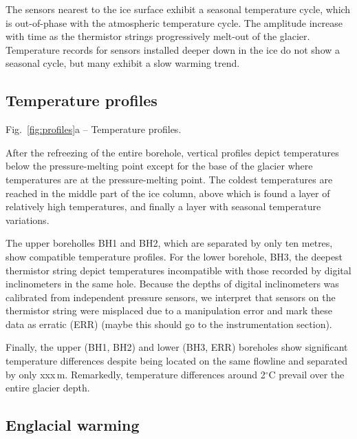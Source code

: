 \documentclass[utf8]{article}
\begin{document}
    The sensors nearest to the ice surface exhibit a seasonal temperature
    cycle, which is out-of-phase with the atmospheric temperature cycle. The
    amplitude increase with time as the thermistor strings progressively
    melt-out of the glacier. Temperature records for sensors installed deeper
    down in the ice do not show a seasonal cycle, but many exhibit a slow
    warming trend.


\subsection{Temperature profiles}

    Fig.~\ref{fig:profiles}a -- Temperature profiles.

    After the refreezing of the entire borehole, vertical profiles depict
    temperatures below the pressure-melting point except for the base of the
    glacier where temperatures are at the pressure-melting point. The coldest
    temperatures are reached in the middle part of the ice column, above which
    is found a layer of relatively high temperatures, and finally a layer with
    seasonal temperature variations.

    The upper boreholles BH1 and BH2, which are separated by only ten metres,
    show compatible temperature profiles. For the lower borehole, BH3, the
    deepest thermistor string depict temperatures incompatible with those
    recorded by digital inclinometers in the same hole. Because the depths of
    digital inclinometers was calibrated from independent pressure sensors, we
    interpret that sensors on the thermistor string were misplaced due to a
    manipulation error and mark these data as erratic (ERR) (maybe this should
    go to the instrumentation section).

    Finally, the upper (BH1, BH2) and lower (BH3, ERR) boreholes show
    significant temperature differences despite being located on the same
    flowline and separated by only xxx\,m. Remarkedly, temperature differences
    around 2$^\circ$C prevail over the entire glacier depth.


\subsection{Englacial warming}
\end{document}
